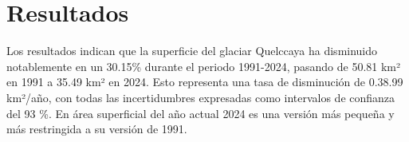 
\section{Resultados}

Los resultados indican que la superficie del glaciar Quelccaya ha disminuido notablemente en un 30.15\% durante el periodo 1991-2024, pasando de 50.81 km² en 1991 a 35.49 km² en 2024. Esto representa una tasa de disminución de 0.38.99 km²/año, con todas las incertidumbres expresadas como intervalos de confianza del 93 \%. En área superficial del año actual 2024 es una versión más pequeña y más restringida a su versión de 1991. 

